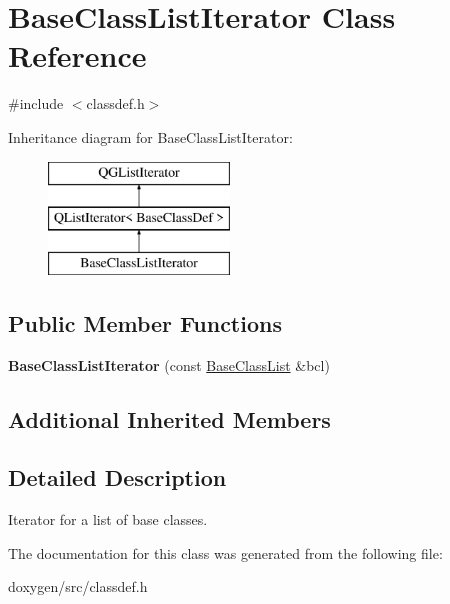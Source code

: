\hypertarget{class_base_class_list_iterator}{}\section{Base\+Class\+List\+Iterator Class Reference}
\label{class_base_class_list_iterator}


{\ttfamily \#include $<$classdef.\+h$>$}

Inheritance diagram for Base\+Class\+List\+Iterator\+:\begin{figure}[H]
\begin{center}
\leavevmode
\includegraphics[height=3.000000cm]{class_base_class_list_iterator}
\end{center}
\end{figure}
\subsection*{Public Member Functions}
\begin{DoxyCompactItemize}
\item 
\mbox{\label{class_base_class_list_iterator_a9048d16a4d9345a7c861ffb2b8c121e2}} 
{\bfseries Base\+Class\+List\+Iterator} (const \mbox{\hyperlink{class_base_class_list}{Base\+Class\+List}} \&bcl)
\end{DoxyCompactItemize}
\subsection*{Additional Inherited Members}


\subsection{Detailed Description}
Iterator for a list of base classes. 

The documentation for this class was generated from the following file\+:\begin{DoxyCompactItemize}
\item 
doxygen/src/classdef.\+h\end{DoxyCompactItemize}
